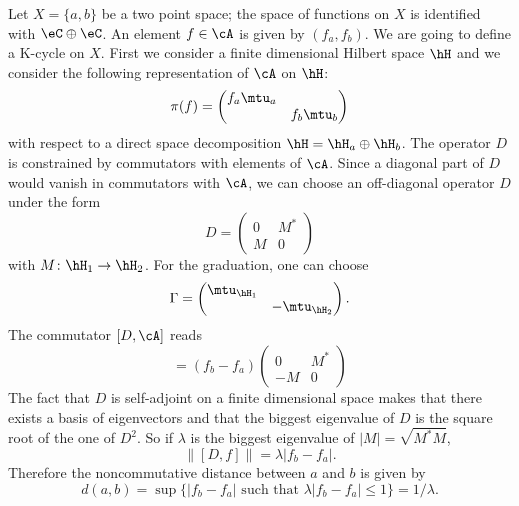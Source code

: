 Let $X=\{ a,b \}$ be a two point space; the space of functions on $X$ is identified with $\eC\oplus\eC$. An element $f\in\cA$ is given by $(f_a,f_b)$. We are going to define a K-cycle on $X$. First we consider a finite dimensional Hilbert space $\hH$ and we consider the following representation of $\cA$ on $\hH$:
\[
	\pi(f)=\begin{pmatrix}
		f_a\mtu_a \\&f_b\mtu_b
	\end{pmatrix}
\]
with respect to a direct space decomposition $\hH=\hH_a\oplus\hH_b$. The operator $D$ is constrained by commutators with elements of $\cA$. Since a diagonal part of $D$ would vanish in commutators with $\cA$, we can choose an off-diagonal operator $D$ under the form
\begin{equation}
	D=\begin{pmatrix}
		0 & M^* \\
		M & 0
	\end{pmatrix}
\end{equation}
with $M\colon \hH_1\to \hH_2$. For the graduation, one can choose
\[
	\Gamma=\begin{pmatrix}
		\mtu_{\hH_1}     \\
		 & -\mtu_{\hH_2}
	\end{pmatrix}.
\]
The commutator $[D,\cA]$ reads
\begin{equation}
	[D,f]=(f_b-f_a)\begin{pmatrix}
		0  & M^* \\
		-M & 0
	\end{pmatrix}
\end{equation}
The fact that $D$ is self-adjoint on a finite dimensional space makes that there exists a basis of eigenvectors and that the biggest eigenvalue of $D$ is the square root of the one of $D^2$. So if $\lambda$ is the biggest eigenvalue of $| M |=\sqrt{M^*M}$,
\[
	\| [D,f] \|=\lambda|f_b-f_a|.
\]
Therefore the noncommutative distance between $a$ and $b$ is given by
\begin{equation}
	d(a,b)=\sup\{ | f_b-f_a |\text{ such that } \lambda| f_b-f_a |\leq 1 \}=1/\lambda.
\end{equation}



